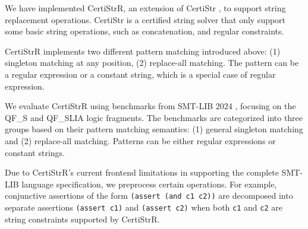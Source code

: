 We have implemented CertiStrR, an extension of  CertiStr \cite{cpp/KanLRS22}, to support string replacement operations.
CertiStr \cite{cpp/KanLRS22} is a certified string solver that only support some basic string operations, such as concatenation, and regular constraints. 



CertiStrR implements two different pattern matching introduced above: (1) singleton matching at any position, (2) replace-all matching. The pattern can be a regular expression or a constant string, which is a special case of regular expression.

%
%


We evaluate CertiStrR using benchmarks from SMT-LIB 2024 \cite{smtlib_benchmarks}, focusing on the QF\_S and QF\_SLIA logic fragments. The benchmarks are categorized into three groups based on their pattern matching semantics: (1) general singleton matching and (2) replace-all matching. Patterns can be either regular expressions or constant strings.

Due to CertiStrR's current frontend limitations in supporting the complete SMT-LIB language specification, we preprocess certain operations. For example, conjunctive assertions of the form \texttt{(assert (and c1 c2))} are decomposed into separate assertions \texttt{(assert c1)} and \texttt{(assert c2)} when both \texttt{c1} and \texttt{c2} are string constraints supported by CertiStrR.

